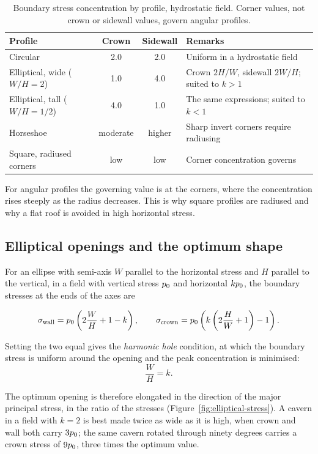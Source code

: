 \begin{table}[htbp]
\caption{Boundary stress concentration by profile, hydrostatic field.
Corner values, not crown or sidewall values, govern angular profiles.}
\label{tab:shape-factors}
\centering
\small
\begin{tabularx}{\textwidth}{l c c X}
\toprule
\textbf{Profile} & \textbf{Crown} & \textbf{Sidewall} & \textbf{Remarks} \\
\midrule
Circular & 2.0 & 2.0 & Uniform in a hydrostatic field \\
Elliptical, wide ($W/H = 2$) & 1.0 & 4.0 & Crown $2H/W$, sidewall $2W/H$; suited to $k > 1$ \\
Elliptical, tall ($W/H = 1/2$) & 4.0 & 1.0 & The same expressions; suited to $k < 1$ \\
Horseshoe & moderate & higher & Sharp invert corners require radiusing \\
Square, radiused corners & low & low & Corner concentration governs \\
\bottomrule
\end{tabularx}
\end{table}

For angular profiles the governing value is at the corners, where the
concentration rises steeply as the radius decreases. This is why square
profiles are radiused and why a flat roof is avoided in high horizontal
stress.

\subsection{Elliptical openings and the optimum shape}
\label{sec:elliptical}

For an ellipse with semi-axis $W$ parallel to the horizontal stress and $H$
parallel to the vertical, in a field with vertical stress $p_0$ and
horizontal $kp_0$, the boundary stresses at the ends of the axes are

\[
\sigma_{\text{wall}} = p_0\left(2\frac{W}{H} + 1 - k\right),
\qquad
\sigma_{\text{crown}} = p_0\left(k\left(2\frac{H}{W} + 1\right) - 1\right).
\]

Setting the two equal gives the \emph{harmonic hole} condition, at which the
boundary stress is uniform around the opening and the peak concentration is
minimised:
\[
\frac{W}{H} = k .
\]

The optimum opening is therefore elongated in the direction of the major
principal stress, in the ratio of the stresses
(Figure~\ref{fig:elliptical-stress}). A cavern in a field with
$k = 2$ is best made twice as wide as it is high, when crown and wall both
carry $3p_0$; the same cavern rotated through ninety degrees carries a
crown stress of $9p_0$, three times the optimum value.

